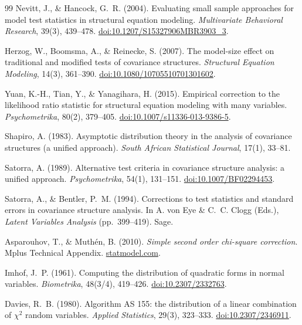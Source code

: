 \documentclass[11pt]{article}
\theoremstyle{plain}
\theoremstyle{remark}
\begin{document}
\begin{thebibliography}{99}
 Nevitt, J., \& Hancock, G.~R. (2004). Evaluating
small sample approaches for model test statistics in structural equation modeling.
\emph{Multivariate Behavioral Research}, 39(3), 439--478.
\href{https://doi.org/10.1207/S15327906MBR3903_3}{doi:10.1207/S15327906MBR3903\_3}.

 Herzog, W., Boomsma, A., \& Reinecke, S.
(2007). The model-size effect on traditional and modified tests of covariance
structures. \emph{Structural Equation Modeling}, 14(3), 361--390.
\href{https://doi.org/10.1080/10705510701301602}{doi:10.1080/10705510701301602}.

 Yuan, K.-H., Tian, Y., \& Yanagihara, H. (2015).
Empirical correction to the likelihood ratio statistic for structural equation
modeling with many variables. \emph{Psychometrika}, 80(2), 379--405.
\href{https://doi.org/10.1007/s11336-013-9386-5}{doi:10.1007/s11336-013-9386-5}.

 Shapiro, A. (1983). Asymptotic distribution theory in the
analysis of covariance structures (a unified approach). \emph{South African
Statistical Journal}, 17(1), 33--81.

 Satorra, A. (1989). Alternative test criteria in covariance
structure analysis: a unified approach. \emph{Psychometrika}, 54(1), 131--151.
\href{https://doi.org/10.1007/BF02294453}{doi:10.1007/BF02294453}.

 Satorra, A., \& Bentler, P.~M. (1994). Corrections
to test statistics and standard errors in covariance structure analysis. In A.
von Eye \& C.~C. Clogg (Eds.), \emph{Latent Variables Analysis} (pp.\ 399--419).
Sage.

 Asparouhov, T., \& Muth\'en, B. (2010).
\emph{Simple second order chi-square correction}. Mplus Technical Appendix.
\href{https://www.statmodel.com/download/WLSMV_new_chi21.pdf}{statmodel.com}.

 Imhof, J.~P. (1961). Computing the distribution of quadratic
forms in normal variables. \emph{Biometrika}, 48(3/4), 419--426.
\href{https://doi.org/10.2307/2332763}{doi:10.2307/2332763}.

 Davies, R.~B. (1980). Algorithm AS 155: the distribution of a
linear combination of $\chi^2$ random variables. \emph{Applied Statistics},
29(3), 323--333.
\href{https://doi.org/10.2307/2346911}{doi:10.2307/2346911}.


\end{thebibliography}
\end{document}
